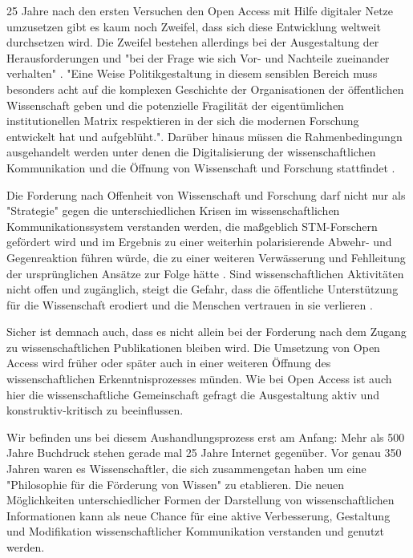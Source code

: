 25 Jahre nach den ersten Versuchen den Open Access mit Hilfe digitaler Netze umzusetzen gibt es kaum noch Zweifel, dass sich diese Entwicklung weltweit durchsetzen wird. Die Zweifel bestehen allerdings bei der Ausgestaltung der Herausforderungen und "bei der Frage wie sich Vor- und Nachteile zueinander verhalten" \cite{hagner_2015_sache_buches}. "Eine Weise Politikgestaltung in diesem sensiblen Bereich muss besonders acht auf die komplexen Geschichte der Organisationen der öffentlichen Wissenschaft geben und die potenzielle Fragilität der eigentümlichen institutionellen Matrix respektieren in der sich die modernen Forschung entwickelt hat und aufgeblüht."\cite{david1998_common}. Darüber hinaus müssen die Rahmenbedingungn ausgehandelt werden unter denen die Digitalisierung der wissenschaftlichen Kommunikation und die Öffnung von Wissenschaft und Forschung stattfindet \cite{mennes_2013_making_os}.

Die Forderung nach Offenheit von Wissenschaft und Forschung darf nicht nur als "Strategie" gegen die unterschiedlichen Krisen im wissenschaftlichen Kommunikationssystem verstanden werden, die maßgeblich STM-Forschern gefördert wird und im Ergebnis zu einer weiterhin polarisierende Abwehr- und Gegenreaktion führen würde, die zu einer weiteren Verwässerung und Fehlleitung der ursprünglichen Ansätze zur Folge hätte \cite{naeder_2010_open}. Sind wissenschaftlichen Aktivitäten nicht offen und zugänglich, steigt die Gefahr, dass die öffentliche Unterstützung für die Wissenschaft erodiert und die Menschen vertrauen in sie verlieren \cite{resnik_2005_ethics}.

Sicher ist demnach auch, dass es nicht allein bei der Forderung nach dem Zugang zu wissenschaftlichen Publikationen bleiben wird. Die Umsetzung von Open Access wird früher oder später auch in einer weiteren Öffnung des wissenschaftlichen Erkenntnisprozesses münden. Wie bei Open Access ist auch hier die wissenschaftliche Gemeinschaft gefragt die Ausgestaltung aktiv und konstruktiv-kritisch zu beeinflussen.

Wir befinden uns bei diesem Aushandlungsprozess erst am Anfang: Mehr als 500 Jahre Buchdruck stehen gerade mal 25 Jahre Internet gegenüber. Vor genau 350 Jahren waren es Wissenschaftler, die sich zusammengetan haben um eine "Philosophie für die Förderung von Wissen" zu etablieren. Die neuen Möglichkeiten unterschiedlicher Formen der Darstellung von wissenschaftlichen Informationen kann als neue Chance für eine aktive Verbesserung, Gestaltung und Modifikation wissenschaftlicher Kommunikation verstanden und genutzt werden.

